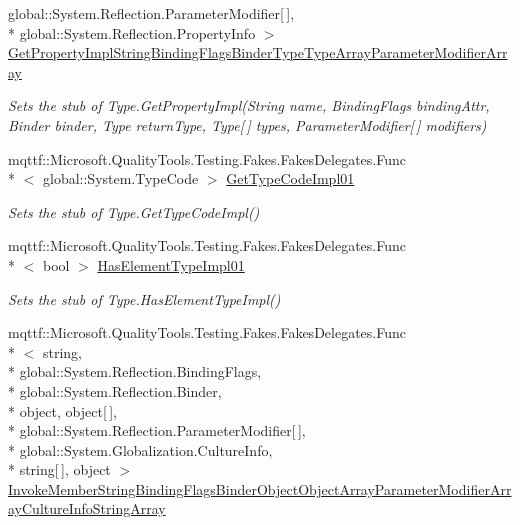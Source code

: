 \begin{DoxyCompactItemize}
global\-::\-System.\-Reflection.\-Parameter\-Modifier\mbox{[}$\,$\mbox{]}, \\*
global\-::\-System.\-Reflection.\-Property\-Info $>$ \hyperlink{class_system_1_1_fakes_1_1_stub_type_af986d4c52b460bf6c64e8ca14277f632}{Get\-Property\-Impl\-String\-Binding\-Flags\-Binder\-Type\-Type\-Array\-Parameter\-Modifier\-Array}
\begin{DoxyCompactList}\small\item\em Sets the stub of Type.\-Get\-Property\-Impl(\-String name, Binding\-Flags binding\-Attr, Binder binder, Type return\-Type, Type\mbox{[}$\,$\mbox{]} types, Parameter\-Modifier\mbox{[}$\,$\mbox{]} modifiers)\end{DoxyCompactList}\item 
mqttf\-::\-Microsoft.\-Quality\-Tools.\-Testing.\-Fakes.\-Fakes\-Delegates.\-Func\\*
$<$ global\-::\-System.\-Type\-Code $>$ \hyperlink{class_system_1_1_fakes_1_1_stub_type_a59454429b4ec4a8b5ea7b76580b0de87}{Get\-Type\-Code\-Impl01}
\begin{DoxyCompactList}\small\item\em Sets the stub of Type.\-Get\-Type\-Code\-Impl()\end{DoxyCompactList}\item 
mqttf\-::\-Microsoft.\-Quality\-Tools.\-Testing.\-Fakes.\-Fakes\-Delegates.\-Func\\*
$<$ bool $>$ \hyperlink{class_system_1_1_fakes_1_1_stub_type_a64e5fecbb23d701f41a824e70b8b78c3}{Has\-Element\-Type\-Impl01}
\begin{DoxyCompactList}\small\item\em Sets the stub of Type.\-Has\-Element\-Type\-Impl()\end{DoxyCompactList}\item 
mqttf\-::\-Microsoft.\-Quality\-Tools.\-Testing.\-Fakes.\-Fakes\-Delegates.\-Func\\*
$<$ string, \\*
global\-::\-System.\-Reflection.\-Binding\-Flags, \\*
global\-::\-System.\-Reflection.\-Binder, \\*
object, object\mbox{[}$\,$\mbox{]}, \\*
global\-::\-System.\-Reflection.\-Parameter\-Modifier\mbox{[}$\,$\mbox{]}, \\*
global\-::\-System.\-Globalization.\-Culture\-Info, \\*
string\mbox{[}$\,$\mbox{]}, object $>$ \hyperlink{class_system_1_1_fakes_1_1_stub_type_a84eb40906faa3e285a4929b6ee6f6ed1}{Invoke\-Member\-String\-Binding\-Flags\-Binder\-Object\-Object\-Array\-Parameter\-Modifier\-Array\-Culture\-Info\-String\-Array}

\end{DoxyCompactItemize}

